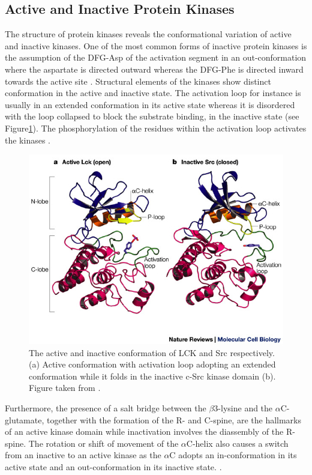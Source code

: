 \documentclass[a4paper, 11pt]{report}
\begin{document}
\subsection{Active and Inactive Protein Kinases}
\label{sec:kinasereg}
The structure of protein kinases reveals the conformational variation of active and inactive kinases. One of the most common forms of inactive  protein kinases is the assumption of the DFG-Asp of the activation segment in an out-conformation where the aspartate is directed outward whereas the DFG-Phe is directed inward towards the active site \cite{roskoski2016classification}. Structural elements of the kinases show distinct conformation in the active and inactive state. The activation loop for instance is usually in an extended conformation in its active state whereas it is disordered with the loop collapsed to block the substrate binding, in the inactive state (see Figure\ref{kinstruct}). The phosphorylation of the residues within the activation loop activates the kinases \cite{roskoski2016classification}. 
\begin{figure}[H]
	\includegraphics[width=.8\linewidth]{figures/actkin.jpg}
	\centering
	\caption{The active and inactive conformation of LCK and Src respectively. (a) Active conformation with activation loop adopting an extended conformation while it folds in the inactive c-Src kinase domain (b). Figure taken from \cite{hantschel2004regulation}.}
	\label{kinstruct}
\end{figure}
Furthermore, the presence of a salt bridge between the $\beta3$-lysine and the $\alpha$C-glutamate, together with the formation of the R- and C-spine, are the hallmarks of an active kinase domain while inactivation involves the diassembly of the R-spine. The rotation or shift of movement of the $\alpha$C-helix also causes a switch from an inactive to an active kinase as the $\alpha$C adopts an in-conformation in its active state and an out-conformation in its inactive state. \cite{tsai2013molecular,roskoski2016classification}.
\end{document}
